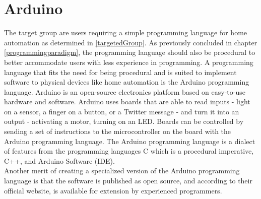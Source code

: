 \section{Arduino}
The target group are users requiring a simple programming language for home automation as determined in \ref{targetedGroup}. As previously concluded in chapter \ref{programmingparadigm}, the programming language should also be procedural to better accommodate users with less experience in programming.
A programming language that fits the need for being procedural and is suited to implement software to physical devices like home automation is the Arduino programming language. Arduino is an open-source electronics platform based on easy-to-use hardware and software. Arduino uses boards that are able to read inputs - light on a sensor, a finger on a button, or a Twitter message - and turn it into an output - activating a motor, turning on an LED. Boards can be controlled by sending a set of instructions to the microcontroller on the board with the Arduino programming language. The Arduino programming language is a dialect of features from the programming languages C which is a procedural imperative, C++, and Arduino Software (IDE)\cite{audionocc}. \\


Another merit of creating a specialized version of the Arduino programming language is that the software is published as open source, and according to their official website, is available for extension by experienced programmers\cite{audionocc}.








